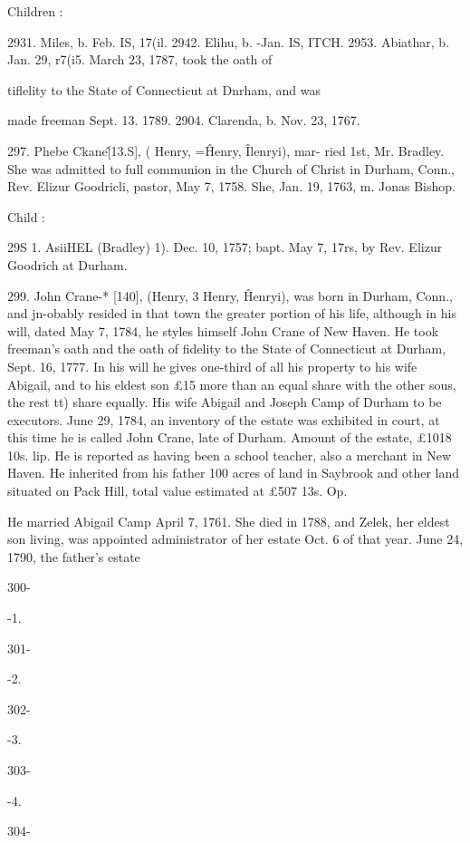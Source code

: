 Children : 

2931. Miles, b. Feb. IS, 17(il. 
2942. Elihu, b. -Jan. IS, ITCH. 
2953. Abiathar, b. Jan. 29, r7(i5. March 23, 1787, took the oath of 

tiflelity to the State of Connecticut at Dnrham, and was 

made freeman Sept. 13. 1789. 
2904. Clarenda, b. Nov. 23, 1767. 

297. Phebe Ckane\^ [13.S], ( Henry, =\^ Henry, \^ Ilenryi), mar- 
ried 1st, Mr. Bradley. She was admitted to full communion in 
the Church of Christ in Durham, Conn., Rev. Elizur Goodricli, 
pastor, May 7, 1758. She, Jan. 19, 1763, m. Jonas Bishop. 

Child : 

29S 1. AsiiHEL (Bradley) 1). Dec. 10, 1757; bapt. May 7, 17rs, by 
Rev. Elizur Goodrich at Durham. 

299. John Crane-* [140], (Henry, 3 Henry, \^ Henryi), was 
born in Durham, Conn., and jn-obably resided in that town the 
greater portion of his life, although in his will, dated May 7, 
1784, he styles himself John Crane of New Haven. He took 
freeman's oath and the oath of fidelity to the State of Connecticut 
at Durham, Sept. 16, 1777. In his will he gives one-third of all 
his property to his wife Abigail, and to his eldest son £15 more 
than an equal share with the other sous, the rest tt) share equally. 
His wife Abigail and Joseph Camp of Durham to be executors. 
June 29, 1784, an inventory of the estate was exhibited in court, 
at this time he is called John Crane, late of Durham. Amount 
of the estate, £1018 10s.  lip. He is reported as having been 
a school teacher, also a merchant in New Haven. He inherited 
from his father 100 acres of land in Saybrook and other land 
situated on Pack Hill, total value estimated at £507  13s.  Op. 

He married Abigail Camp April 7, 1761. She died in 1788, and 
Zelek, her eldest son living, was appointed administrator of her 
estate Oct. 6 of that year. June 24, 1790, the father's estate 



300- 


-1. 


301- 


-2. 


302- 


-3. 


303- 


-4. 


304- 


